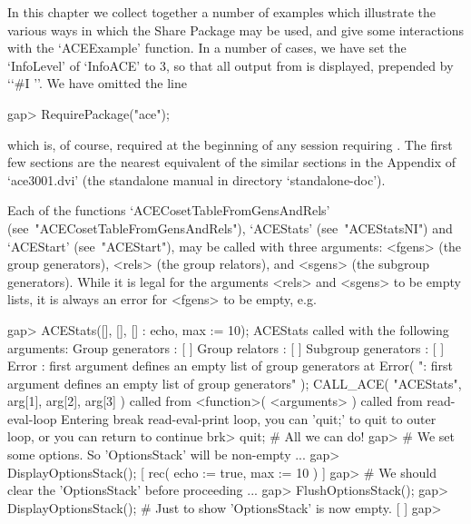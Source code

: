 

In this chapter  we  collect  together  a  number  of  examples  which
illustrate the various ways in which the {\ACE} Share Package  may  be
used, and give some interactions with the  `ACEExample'  function.  In
a number of cases, we have set the `InfoLevel' of `InfoACE' to  3,  so
that all output from {\ACE} is displayed, prepended by  \lq{}`\#I  ''.
We have omitted the line

\beginexample
gap> RequirePackage("ace");
\endexample

which is,  of  course,  required  at  the  beginning  of  any  session
requiring {\ACE}. The  first  few  sections  are  the  nearest  {\GAP}
equivalent of the similar sections in the  Appendix  of  `ace3001.dvi'
(the standalone manual in directory `standalone-doc').


Each of the functions `ACECosetTableFromGensAndRels'
(see~"ACECosetTableFromGensAndRels"), `ACEStats' (see~"ACEStatsNI")
and `ACEStart' (see~"ACEStart"), may be called with three arguments:
<fgens> (the group generators), <rels> (the group relators), and <sgens>
(the subgroup generators). While it is legal for the arguments <rels> and
<sgens> to be empty lists, it is always an error for <fgens> to be empty,
e.g.

\beginexample
gap> ACEStats([], [], [] : echo, max := 10);
ACEStats called with the following arguments:
 Group generators : [  ]
 Group relators : [  ]
 Subgroup generators : [  ]
Error : first argument defines an empty list of group generators at
Error( ": first argument defines an empty list of group generators" );
CALL_ACE( "ACEStats", arg[1], arg[2], arg[3] ) called from
<function>( <arguments> ) called from read-eval-loop
Entering break read-eval-print loop, you can 'quit;' to quit to outer loop,
or you can return to continue
brk> quit; # All we can do!                  
gap> # We set some options. So 'OptionsStack' will be non-empty ...
gap> DisplayOptionsStack();
[ rec(
      echo := true,
      max := 10 ) ]
gap> # We should clear the 'OptionsStack' before proceeding ...
gap> FlushOptionsStack();
gap> DisplayOptionsStack(); # Just to show 'OptionsStack' is now empty.
[  ]
gap>
\endexample

